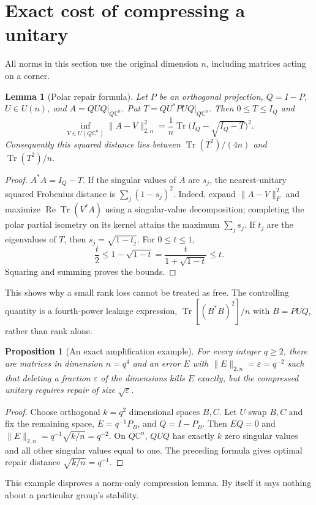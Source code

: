 \documentclass[11pt]{article}
\newtheorem{lemma}[theorem]{Lemma}
\newtheorem{proposition}[theorem]{Proposition}
\newcommand{\tr}{\operatorname{Tr}}
\newcommand{\eps}{\varepsilon}
\begin{document}
\section{Exact cost of compressing a unitary}
All norms in this section use the original dimension $n$, including matrices acting on a corner.
\begin{lemma}[Polar repair formula]
Let $P$ be an orthogonal projection, $Q=I-P$, $U\in U(n)$, and $A=QUQ|_{Q\mathbb C^n}$. Put $T=QU^*PUQ|_{Q\mathbb C^n}$. Then $0\leq T\leq I_Q$ and
\[
\inf_{V\in U(Q\mathbb C^n)}\|A-V\|_{2,n}^2
=\frac1n\tr\bigl(I_Q-\sqrt{I_Q-T}\bigr)^2.
\]
Consequently this squared distance lies between $\tr(T^2)/(4n)$ and $\tr(T^2)/n$.
\end{lemma}
\begin{proof}
$A^*A=I_Q-T$. If the singular values of $A$ are $s_j$, the nearest-unitary squared Frobenius distance is $\sum_j(1-s_j)^2$. Indeed, expand $\|A-V\|_F^2$ and maximize $\operatorname{Re}\tr(V^*A)$ using a singular-value decomposition; completing the polar partial isometry on its kernel attains the maximum $\sum_j s_j$. If $t_j$ are the eigenvalues of $T$, then $s_j=\sqrt{1-t_j}$. For $0\leq t\leq1$,
\[
\frac{t}{2}\leq1-\sqrt{1-t}=\frac{t}{1+\sqrt{1-t}}\leq t.
\]
Squaring and summing proves the bounds.
\end{proof}

This shows why a small rank loss cannot be treated as free. The controlling quantity is a fourth-power leakage expression, $\tr[(B^*B)^2]/n$ with $B=PUQ$, rather than rank alone.

\begin{proposition}[An exact amplification example]
For every integer $q\geq2$, there are matrices in dimension $n=q^4$ and an error $E$ with $\|E\|_{2,n}=\eps=q^{-2}$ such that deleting a fraction $\eps$ of the dimensions kills $E$ exactly, but the compressed unitary requires repair of size $\sqrt{\eps}$.
\end{proposition}
\begin{proof}
Choose orthogonal $k=q^2$ dimensional spaces $B,C$. Let $U$ swap $B,C$ and fix the remaining space, $E=q^{-1}P_B$, and $Q=I-P_B$. Then $EQ=0$ and $\|E\|_{2,n}=q^{-1}\sqrt{k/n}=q^{-2}$. On $Q\mathbb C^n$, $QUQ$ has exactly $k$ zero singular values and all other singular values equal to one. The preceding formula gives optimal repair distance $\sqrt{k/n}=q^{-1}$.
\end{proof}
This example disproves a norm-only compression lemma. By itself it says nothing about a particular group's stability.
\end{document}
